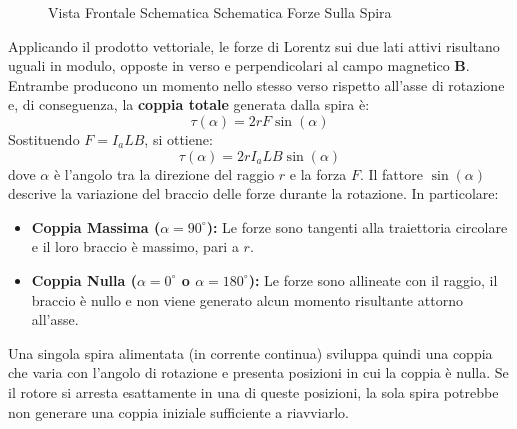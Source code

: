 ﻿\documentclass[11pt, a4paper]{article}
\begin{document}
\begin{figure}[H]
    \caption{Vista Frontale Schematica Schematica Forze Sulla Spira}
\end{figure}
\newpage
Applicando il prodotto vettoriale, le forze di Lorentz sui due lati attivi risultano uguali in modulo, opposte in verso e perpendicolari al campo magnetico \(\mathbf{B}\). Entrambe producono un momento nello stesso verso rispetto all'asse di rotazione e, di conseguenza, la \textbf{coppia totale} generata dalla spira è:
\[
    \tau(\alpha) = 2rF\sin(\alpha)
\]
Sostituendo \(F = I_a L B\), si ottiene:
\[
    \boxed{\tau(\alpha) = 2r I_a L B \sin(\alpha)}
\]
dove \(\alpha\) è l'angolo tra la direzione del raggio \(r\) e la forza \(F\). Il fattore \(\sin(\alpha)\) descrive la variazione del braccio delle forze durante la rotazione. In particolare:
\begin{itemize}
    \item \textbf{Coppia Massima (\(\alpha = 90^\circ\)):} Le forze sono tangenti alla traiettoria circolare e il loro braccio è massimo, pari a \(r\).
    \item \textbf{Coppia Nulla (\(\alpha = 0^\circ\) o \(\alpha = 180^\circ\)):} Le forze sono allineate con il raggio, il braccio è nullo e non viene generato alcun momento risultante attorno all'asse.
\end{itemize}
Una singola spira alimentata (in corrente continua) sviluppa quindi una coppia che varia con l'angolo di rotazione e presenta posizioni in cui la coppia è nulla. Se il rotore si arresta esattamente in una di queste posizioni, la sola spira potrebbe non generare una coppia iniziale sufficiente a riavviarlo.
\end{document}
